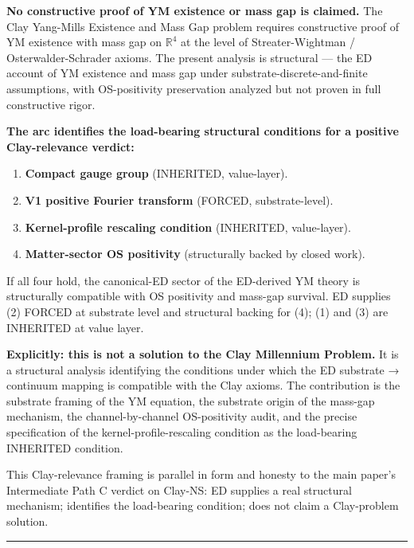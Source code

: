 \documentclass[
]{article}
\providecommand{\tightlist}{%
  \setlength{\itemsep}{0pt}\setlength{\parskip}{0pt}}
\begin{document}
\textbf{No constructive proof of YM existence or mass gap is claimed.}
The Clay Yang-Mills Existence and Mass Gap problem requires constructive
proof of YM existence with mass gap on \(\mathbb{R}^4\) at the level of
Streater-Wightman / Osterwalder-Schrader axioms. The present analysis is
structural --- the ED account of YM existence and mass gap under
substrate-discrete-and-finite assumptions, with OS-positivity
preservation analyzed but not proven in full constructive rigor.

\textbf{The arc identifies the load-bearing structural conditions for a
positive Clay-relevance verdict:}

\begin{enumerate}
\def\labelenumi{\arabic{enumi}.}
\tightlist
\item
  \textbf{Compact gauge group} (INHERITED, value-layer).
\item
  \textbf{V1 positive Fourier transform} (FORCED, substrate-level).
\item
  \textbf{Kernel-profile rescaling condition} (INHERITED, value-layer).
\item
  \textbf{Matter-sector OS positivity} (structurally backed by closed
  work).
\end{enumerate}

If all four hold, the canonical-ED sector of the ED-derived YM theory is
structurally compatible with OS positivity and mass-gap survival. ED
supplies (2) FORCED at substrate level and structural backing for (4);
(1) and (3) are INHERITED at value layer.

\textbf{Explicitly: this is not a solution to the Clay Millennium
Problem.} It is a structural analysis identifying the conditions under
which the ED substrate → continuum mapping is compatible with the Clay
axioms. The contribution is the substrate framing of the YM equation,
the substrate origin of the mass-gap mechanism, the channel-by-channel
OS-positivity audit, and the precise specification of the
kernel-profile-rescaling condition as the load-bearing INHERITED
condition.

This Clay-relevance framing is parallel in form and honesty to the main
paper's Intermediate Path C verdict on Clay-NS: ED supplies a real
structural mechanism; identifies the load-bearing condition; does not
claim a Clay-problem solution.

\begin{center}\rule{0.5\linewidth}{0.5pt}\end{center}
\end{document}
